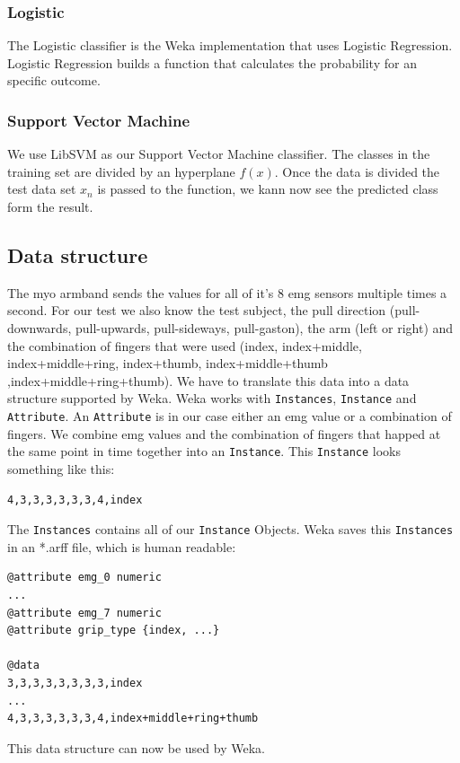 \documentclass[journal]{IEEEtran}
\begin{document}
\subsubsection{Logistic}
The Logistic classifier is the Weka implementation that uses Logistic Regression. Logistic Regression builds a function that calculates the probability for an specific outcome. \autocite{top10}
\subsubsection{Support Vector Machine}
We use LibSVM as our Support Vector Machine classifier. The classes in the training set are divided by an hyperplane $f(x)$. Once the data is divided the test data set $x_n$ is passed to the function, we kann now see the predicted class form the result.
\autocite{top10}

\subsection{Data structure}

The myo armband sends the values for all of it\rq{}s 8 emg sensors multiple times a second. For our test we also know the test subject, the pull direction (pull-downwards, pull-upwards, pull-sideways, pull-gaston), the arm (left or right) and the combination of fingers that were used (index, index+middle, index+middle+ring, index+thumb, index+middle+thumb ,index+middle+ring+thumb).
We have to translate this data into a data structure supported by Weka.
Weka works with \texttt{Instances}, \texttt{Instance} and \texttt{Attribute}. An \texttt{Attribute} is in our case either an emg value or a combination of fingers. We combine emg values and the combination of fingers that happed at the same point in time together into an \texttt{Instance}. This \texttt{Instance} looks something like this:
\begin{verbatim}
4,3,3,3,3,3,3,4,index
\end{verbatim}
The \texttt{Instances} contains all of our \texttt{Instance} Objects. Weka saves this \texttt{Instances} in an *.arff file, which is human readable:

\begin{lstlisting}
@attribute emg_0 numeric
...
@attribute emg_7 numeric
@attribute grip_type {index, ...}

@data
3,3,3,3,3,3,3,3,index
...
4,3,3,3,3,3,3,4,index+middle+ring+thumb
\end{lstlisting}

This data structure can now be used by Weka.
\end{document}
